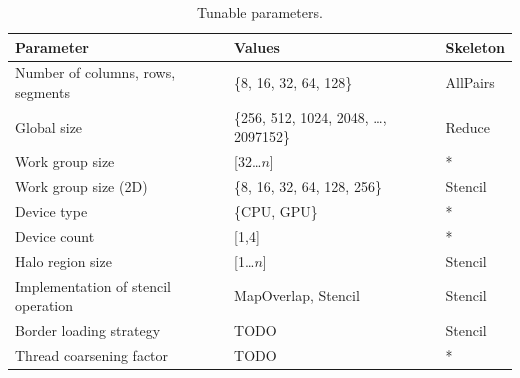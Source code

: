 \begin{table}
\footnotesize
\centering
\begin{tabular}{| l | l | l |}
\hline
\textbf{Parameter} & \textbf{Values} & \textbf{Skeleton}\\
\hline
Number of columns, rows, segments & \{8, 16, 32, 64, 128\} & AllPairs\\
Global size & \{256, 512, 1024, 2048, \ldots, 2097152\} & Reduce\\
Work group size & [32\ldots$n$] & *\\
Work group size (2D) & \{8, 16, 32, 64, 128, 256\} & Stencil\\
Device type & \{CPU, GPU\} & *\\
Device count & [1,4] & *\\
Halo region size & [1\ldots$n$] & Stencil\\
Implementation of stencil operation & {MapOverlap, Stencil} & Stencil\\
Border loading strategy & TODO & Stencil\\
Thread coarsening factor & TODO & *\\
\hline
\end{tabular}
\caption{Tunable parameters.}
\label{tab:knobs}
\end{table}

